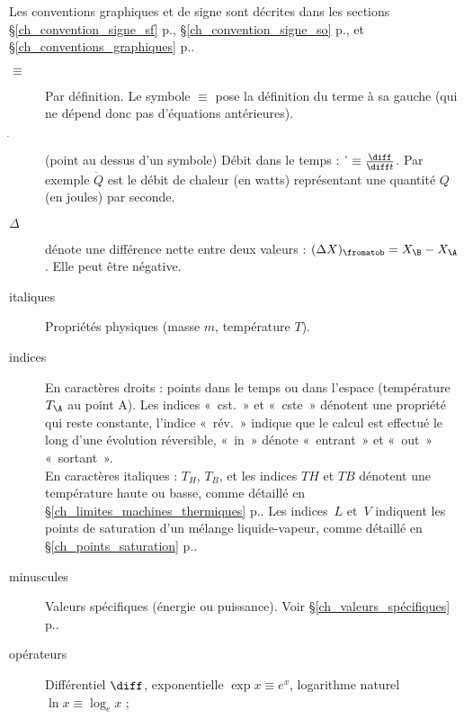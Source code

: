 
\TabPositions{2cm}

Les conventions graphiques et de signe sont décrites dans les sections \S\ref{ch_convention_signe_sf} p.\pageref{ch_convention_signe_sf}, \S\ref{ch_convention_signe_so} p.\pageref{ch_convention_signe_so}, et \S\ref{ch_conventions_graphiques} p.\pageref{ch_conventions_graphiques}.


\begin{description}
	\item[$\equiv$] 	\tab Par définition. Le symbole $\equiv$ pose la définition du terme à sa gauche (qui ne dépend donc pas d’équations antérieures).
	\item[$\dot~$]		\tab (point au dessus d’un symbole) Débit dans le temps : $\dot~ \equiv \frac{\diff}{\diff t}$. Par exemple $\dot Q$ est le débit de chaleur (en \si{watts}) représentant une quantité $Q$ (en \si{joules}) par \si{seconde}.
	\item[$\Delta$]	\tab dénote une différence nette entre deux valeurs : $(\Delta X)_\fromatob = X_\B - X_\A$. Elle peut être négative.
	\item[italiques] 	Propriétés physiques (masse $m$, température $T$).
	\item[indices]		En caractères droits : points dans le temps ou dans l’espace (température~$T_\A$ au point A). Les indices «~cst.~» et «~cste~» dénotent une propriété qui reste constante, l’indice «~rév.~» indique que le calcul est effectué le long d’une évolution réversible, «~in~» dénote «~entrant~» et «~out~» «~sortant~».\\
							En caractères italiques : $T_H$, $T_B$, et les indices $TH$ et $TB$ dénotent une température haute ou basse, comme détaillé en \S\ref{ch_limites_machines_thermiques} p.\pageref{ch_limites_machines_thermiques}. Les indices~$L$ et~$V$ indiquent les points de saturation d’un mélange liquide-vapeur, comme détaillé en \S\ref{ch_points_saturation} p.\pageref{ch_points_saturation}.
	\item[minuscules]	Valeurs spécifiques (énergie ou puissance). Voir \S\ref{ch_valeurs_spécifiques} p.\pageref{ch_valeurs_spécifiques}.
	\item[opérateurs]	Différentiel $\diff$, exponentielle $\exp x \equiv e^x $, logarithme naturel $\ln x \equiv \log_e x$ ;

\end{description}
